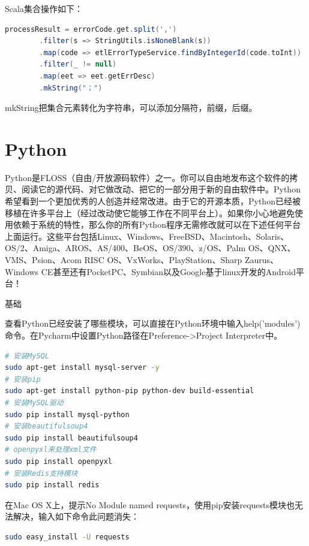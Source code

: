 \documentclass[12pt]{book}
\makeatletter
\numberwithin{dummy}{section}
\theoremstyle{ocrenumbox}
\theoremstyle{blacknumex}
\theoremstyle{blacknumbox}
\theoremstyle{ocrenum}
\renewcommand{\subsection}{\@startsection {subsection}{2}{\z@}
	{-3ex \@plus -0.1ex \@minus -.4ex}
	{0.5ex \@plus.2ex }
	{\normalfont\sffamily\bfseries}}
\makeatother
\begin{document}
Scala集合操作如下：

\begin{lstlisting}[language=Scala]
processResult = errorCode.get.split(',')
		.filter(s => StringUtils.isNoneBlank(s))
		.map(code => etlErrorTypeService.findByIntegerId(code.toInt))
		.filter(_ != null)
		.map(eet => eet.getErrDesc)
		.mkString("；")
\end{lstlisting}

mkString把集合元素转化为字符串，可以添加分隔符，前缀，后缀。

\chapter{Python}

Python是FLOSS（自由/开放源码软件）之一。你可以自由地发布这个软件的拷贝、阅读它的源代码、对它做改动、把它的一部分用于新的自由软件中。Python希望看到一个更加优秀的人创造并经常改进。由于它的开源本质，Python已经被移植在许多平台上（经过改动使它能够工作在不同平台上）。如果你小心地避免使用依赖于系统的特性，那么你的所有Python程序无需修改就可以在下述任何平台上面运行。这些平台包括Linux、Windows、FreeBSD、Macintosh、Solaris、OS/2、Amiga、AROS、AS/400、BeOS、OS/390、z/OS、Palm OS、QNX、VMS、Psion、Acom RISC OS、VxWorks、PlayStation、Sharp Zaurus、Windows CE甚至还有PocketPC、Symbian以及Google基于linux开发的Android平台！

\subsection{基础}

查看Python已经安装了哪些模块，可以直接在Python环境中输入help('modules')命令。在Pycharm中设置Python路径在Preference->Project Interpreter中。

\begin{lstlisting}[language=Bash]
# 安装MySQL
sudo apt-get install mysql-server -y
# 安装pip
sudo apt-get install python-pip python-dev build-essential
# 安装MySQL驱动
sudo pip install mysql-python
# 安装beautifulsoup4
sudo pip install beautifulsoup4
# openpyxl来处理xml文件
sudo pip install openpyxl
# 安装Redis支持模块
sudo pip install redis
\end{lstlisting}

在Mac OS X上，提示No Module named requests，使用pip安装requests模块也无法解决，输入如下命令此问题消失：

\begin{lstlisting}[language=Bash]
sudo easy_install -U requests
\end{lstlisting}
\end{document}
